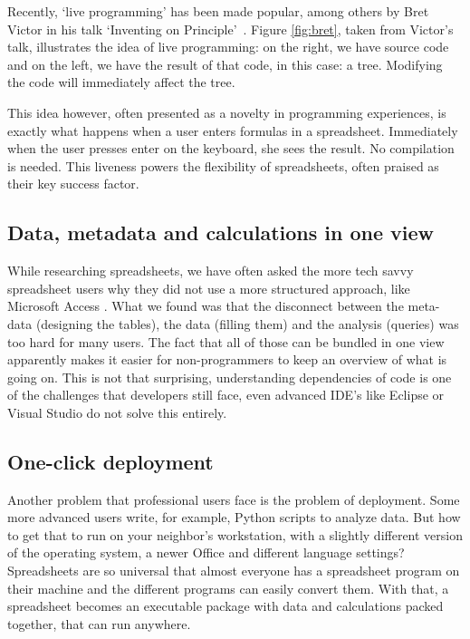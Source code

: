 \documentclass[conference]{IEEEtran}
\begin{document}
Recently, ‘live programming’ has been made popular, among others by Bret Victor in his talk `Inventing on Principle'~\cite{Victor2012}. Figure \ref{fig:bret}, taken from Victor's talk, illustrates the idea of live programming: on the right, we have source code and on the left, we have the result of that code, in this case: a tree. Modifying the code will immediately affect the tree.
 
This idea however, often presented as a novelty in programming experiences, is exactly what happens when a user enters formulas in a spreadsheet. Immediately when the user presses enter on the keyboard, she sees the result. No compilation is needed. This liveness powers the flexibility of spreadsheets, often praised as their key success factor.

\subsection{Data, metadata and calculations in one view}
While researching spreadsheets, we have often asked the more tech savvy spreadsheet users why they did not use a more structured approach, like Microsoft Access  . What we found was that the disconnect between the meta-data (designing the tables), the data (filling them) and the analysis (queries) was too hard for many users. The fact that all of those can be bundled in one view apparently makes it easier for non-programmers to keep an overview of what is going on. This is not that surprising, understanding dependencies of code is one of the challenges that developers still face, even advanced IDE's like Eclipse or Visual Studio do not solve this entirely. 

\subsection{One-click deployment}
Another problem that professional users face is the problem of deployment. Some more advanced users write, for example, Python scripts to analyze data. But how to get that to run on your neighbor's workstation, with a slightly different version of the operating system, a newer Office and different language settings? Spreadsheets are so universal that almost everyone has a spreadsheet program on their machine and the different programs can easily convert them. With that, a spreadsheet becomes an executable package with data and calculations packed together, that can run anywhere.
\end{document}
